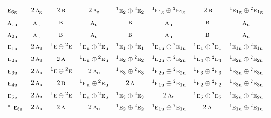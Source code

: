 \documentclass[10pt,a4paper]{article}
\numberwithin{equation}{section}
\newcommand{\irr}[1]{\text{\normalfont\scshape #1}}
\newcommand{\conjpair}[1]{{}^{#1}}
\newcommand{\ptag}[1]{\mathrm{#1}}
\begin{document}
{\begin{longtable}{@{}lccccccc@{}}
$\irr{e}_{6\ptag{g}}$ & $2\,\irr{a}_{\ptag{g}}$ & $2\,\irr{b}$ & $2\,\irr{a}_{\ptag{g}}$ & $\conjpair{1}\irr{e}_{2}\oplus \conjpair{2}\irr{e}_{2}$ & $\conjpair{1}\irr{e}_{1\ptag{g}}\oplus \conjpair{2}\irr{e}_{1\ptag{g}}$ & $2\,\irr{b}$ & $\conjpair{1}\irr{e}_{1\ptag{g}}\oplus \conjpair{2}\irr{e}_{1\ptag{g}}$\\
$\irr{a}_{1\ptag{u}}$ & $\irr{a}_{\ptag{u}}$ & $\irr{b}$ & $\irr{a}_{\ptag{u}}$ & $\irr{b}$ & $\irr{a}_{\ptag{u}}$ & $\irr{b}$ & $\irr{a}_{\ptag{u}}$\\
$\irr{a}_{2\ptag{u}}$ & $\irr{a}_{\ptag{u}}$ & $\irr{b}$ & $\irr{a}_{\ptag{u}}$ & $\irr{b}$ & $\irr{a}_{\ptag{u}}$ & $\irr{b}$ & $\irr{a}_{\ptag{u}}$\\
$\irr{e}_{1\ptag{u}}$ & $2\,\irr{a}_{\ptag{u}}$ & $\conjpair{1}\irr{e}\oplus \conjpair{2}\irr{e}$ & $\conjpair{1}\irr{e}_{\ptag{u}}\oplus \conjpair{2}\irr{e}_{\ptag{u}}$ & $\conjpair{1}\irr{e}_{1}\oplus \conjpair{2}\irr{e}_{1}$ & $\conjpair{1}\irr{e}_{1\ptag{u}}\oplus \conjpair{2}\irr{e}_{1\ptag{u}}$ & $\conjpair{1}\irr{e}_{1}\oplus \conjpair{2}\irr{e}_{1}$ & $\conjpair{1}\irr{e}_{1\ptag{u}}\oplus \conjpair{2}\irr{e}_{1\ptag{u}}$\\
$\irr{e}_{2\ptag{u}}$ & $2\,\irr{a}_{\ptag{u}}$ & $2\,\irr{a}$ & $\conjpair{1}\irr{e}_{\ptag{u}}\oplus \conjpair{2}\irr{e}_{\ptag{u}}$ & $\conjpair{1}\irr{e}_{2}\oplus \conjpair{2}\irr{e}_{2}$ & $\conjpair{1}\irr{e}_{2\ptag{u}}\oplus \conjpair{2}\irr{e}_{2\ptag{u}}$ & $\conjpair{1}\irr{e}_{4}\oplus \conjpair{2}\irr{e}_{4}$ & $\conjpair{1}\irr{e}_{2\ptag{u}}\oplus \conjpair{2}\irr{e}_{2\ptag{u}}$\\
$\irr{e}_{3\ptag{u}}$ & $2\,\irr{a}_{\ptag{u}}$ & $\conjpair{1}\irr{e}\oplus \conjpair{2}\irr{e}$ & $2\,\irr{a}_{\ptag{u}}$ & $\conjpair{1}\irr{e}_{3}\oplus \conjpair{2}\irr{e}_{3}$ & $\conjpair{1}\irr{e}_{2\ptag{u}}\oplus \conjpair{2}\irr{e}_{2\ptag{u}}$ & $\conjpair{1}\irr{e}_{3}\oplus \conjpair{2}\irr{e}_{3}$ & $\conjpair{1}\irr{e}_{3\ptag{u}}\oplus \conjpair{2}\irr{e}_{3\ptag{u}}$\\
$\irr{e}_{4\ptag{u}}$ & $2\,\irr{a}_{\ptag{u}}$ & $2\,\irr{b}$ & $\conjpair{1}\irr{e}_{\ptag{u}}\oplus \conjpair{2}\irr{e}_{\ptag{u}}$ & $2\,\irr{a}$ & $\conjpair{1}\irr{e}_{1\ptag{u}}\oplus \conjpair{2}\irr{e}_{1\ptag{u}}$ & $\conjpair{1}\irr{e}_{2}\oplus \conjpair{2}\irr{e}_{2}$ & $\conjpair{1}\irr{e}_{3\ptag{u}}\oplus \conjpair{2}\irr{e}_{3\ptag{u}}$\\
$\irr{e}_{5\ptag{u}}$ & $2\,\irr{a}_{\ptag{u}}$ & $\conjpair{1}\irr{e}\oplus \conjpair{2}\irr{e}$ & $\conjpair{1}\irr{e}_{\ptag{u}}\oplus \conjpair{2}\irr{e}_{\ptag{u}}$ & $\conjpair{1}\irr{e}_{3}\oplus \conjpair{2}\irr{e}_{3}$ & $2\,\irr{a}_{\ptag{u}}$ & $\conjpair{1}\irr{e}_{5}\oplus \conjpair{2}\irr{e}_{5}$ & $\conjpair{1}\irr{e}_{2\ptag{u}}\oplus \conjpair{2}\irr{e}_{2\ptag{u}}$\\*
$\irr{e}_{6\ptag{u}}$ & $2\,\irr{a}_{\ptag{u}}$ & $2\,\irr{a}$ & $2\,\irr{a}_{\ptag{u}}$ & $\conjpair{1}\irr{e}_{2}\oplus \conjpair{2}\irr{e}_{2}$ & $\conjpair{1}\irr{e}_{1\ptag{u}}\oplus \conjpair{2}\irr{e}_{1\ptag{u}}$ & $2\,\irr{a}$ & $\conjpair{1}\irr{e}_{1\ptag{u}}\oplus \conjpair{2}\irr{e}_{1\ptag{u}}$\\
\bottomrule\end{longtable}}
\end{document}
